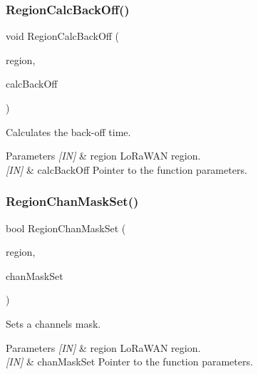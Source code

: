 \subsubsection{\texorpdfstring{Region\+Calc\+Back\+Off()}{RegionCalcBackOff()}}
{\footnotesize\ttfamily void Region\+Calc\+Back\+Off (\begin{DoxyParamCaption}\item[{\hyperlink{group__LORAMAC_ga80c48efda9ae02e14b58160d34a798dd}{Lo\+Ra\+Mac\+Region\+\_\+t}}]{region,  }\item[{\hyperlink{group__REGION_ga7c5c9a8da174e6679eded8257dc92fd9}{Calc\+Back\+Off\+Params\+\_\+t} $\ast$}]{calc\+Back\+Off }\end{DoxyParamCaption})}



Calculates the back-\/off time. 


\begin{DoxyParams}{Parameters}
{\em \mbox{[}\+I\+N\mbox{]}} & region Lo\+Ra\+W\+AN region.\\
\hline
{\em \mbox{[}\+I\+N\mbox{]}} & calc\+Back\+Off Pointer to the function parameters. \\
\hline
\end{DoxyParams}
\mbox{\label{group__REGION_ga795ed3c13f4c8d03e39298fd64e5b2df}} 
\subsubsection{\texorpdfstring{Region\+Chan\+Mask\+Set()}{RegionChanMaskSet()}}
{\footnotesize\ttfamily bool Region\+Chan\+Mask\+Set (\begin{DoxyParamCaption}\item[{\hyperlink{group__LORAMAC_ga80c48efda9ae02e14b58160d34a798dd}{Lo\+Ra\+Mac\+Region\+\_\+t}}]{region,  }\item[{\hyperlink{group__REGION_ga6d24f7da136006410827dfb29f6b9b9e}{Chan\+Mask\+Set\+Params\+\_\+t} $\ast$}]{chan\+Mask\+Set }\end{DoxyParamCaption})}



Sets a channels mask. 


\begin{DoxyParams}{Parameters}
{\em \mbox{[}\+I\+N\mbox{]}} & region Lo\+Ra\+W\+AN region.\\
\hline
{\em \mbox{[}\+I\+N\mbox{]}} & chan\+Mask\+Set Pointer to the function parameters.\\
\hline
\end{DoxyParams}

